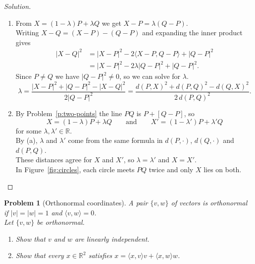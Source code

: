 \documentclass[11pt,a4paper]{article}
\theoremstyle{boxed}
\newtheorem{problem}{Problem}
\theoremstyle{definition}
\newenvironment{solution}{\begin{proof}[Solution]}{\end{proof}}
\newenvironment{plate}{\par\medskip\noindent\begin{minipage}{\linewidth}\centering}{\end{minipage}\par\medskip}
\newcommand{\R}{\mathbb{R}}
\newcommand{\ip}[2]{\langle #1, #2 \rangle}
\newcommand{\abs}[1]{\lvert #1 \rvert}
\begin{document}
\begin{solution}
\leavevmode
\begin{enumerate}
    \item From $X=(1-\lambda)P+\lambda Q$ we get $X-P=\lambda(Q-P)$.\\
    Writing $X-Q=(X-P)-(Q-P)$ and expanding the inner product gives
    \begin{align*}
    \abs{X-Q}^2 &= \abs{X-P}^2-2\ip{X-P}{Q-P}+\abs{Q-P}^2\\
    &= \abs{X-P}^2-2\lambda\abs{Q-P}^2+\abs{Q-P}^2.
    \end{align*}
    Since $P\neq Q$ we have $\abs{Q-P}^2\neq0$, so we can solve for $\lambda$.
    \[
    \lambda=\frac{\abs{X-P}^2+\abs{Q-P}^2-\abs{X-Q}^2}{2\abs{Q-P}^2}=\frac{d(P,X)^2+d(P,Q)^2-d(Q,X)^2}{2\,d(P,Q)^2}.
    \]
    \item By Problem~\ref{p:two-points} the line $PQ$ is $P+[Q-P]$, so
    \[
    X=(1-\lambda)P+\lambda Q \qquad\text{and}\qquad X'=(1-\lambda')P+\lambda'Q
    \]
    for some $\lambda,\lambda'\in\R$.\\
    By (a), $\lambda$ and $\lambda'$ come from the same formula in $d(P,\cdot)$, $d(Q,\cdot)$ and $d(P,Q)$.\\
    These distances agree for $X$ and $X'$, so $\lambda=\lambda'$ and $X=X'$.\\
    In Figure~\ref{fig:circles}, each circle meets $PQ$ twice and only $X$ lies on both. \qedhere
\end{enumerate}
\end{solution}

\begin{plate}
\label{fig:circles}
\end{plate}

\begin{problem}[Orthonormal coordinates]\label{p:orthonormal}
A pair $\{v,w\}$ of vectors is \emph{orthonormal} if $\abs{v}=\abs{w}=1$ and $\ip{v}{w}=0$.\\
Let $\{v,w\}$ be orthonormal.
\begin{enumerate}
    \item Show that $v$ and $w$ are linearly independent.
    \item Show that every $x\in\R^2$ satisfies $x=\ip{x}{v}v+\ip{x}{w}w$.
\end{enumerate}
\end{problem}
\end{document}
